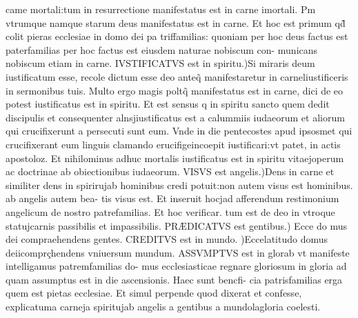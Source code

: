 \documentclass{article}
\begin{document}
\begin{pages}
came mortali:tum in resurrectione manifestatus est in carne imortali. Pm vtrumque namque starum deus manifestatus est in carne. Et hoc est primum qd̃ colit pieras ecclesiae in domo dei pa triffamilias: quoniam per hoc deus factus est paterfamilias per hoc factus est eiusdem naturae nobiscum con- municans nobiscum etiam in carne. IVSTIFICATVS est in spiritu.)Si miraris deum iustificatum esse, recole dictum esse deo anteq̃ manifestaretur in carneliustificeris in sermonibus tuis. Multo ergo magis poltq̃ manifestatus est in carne, dici de eo potest iustificatus est in spiritu. Et est sensus q in spiritu sancto quem dedit discipulis et consequenter alnsjiustificatus est a calummiis iudaeorum et aliorum qui crucifixerunt a persecuti sunt eum. Vnde in die pentecostes apud ipsosmet qui crucifixerant eum linguis clamando erucifigeincoepit iustificari:vt patet, in actis apostoloz. Et nihilominus adhuc mortalis iustificatus est in spiritu vitaejoperum ac doctrinae ab obiectionibus iudaeorum. VISVS est angelis.)Dens in carne et similiter dens in spirirujab hominibus credi potuit:non autem visus est hominibus. ab angelis autem bea- tis visus est. Et inseruit hocjad afferendum restimonium angelicum de nostro patrefamilias. Et hoc verificar. tum est de deo in vtroque statujcarnis passibilis et impassibilis. PRÆDICATVS est gentibus.) Ecce do mus dei compraehendens gentes. CREDITVS est in mundo. )Eccelatitudo domus deiicomprçhendens vniuersum mundum. ASSVMPTVS est in glorab vt manifeste intelligamus patremfamilias do- mus ecclesiasticae regnare gloriosum in gloria ad quam assumptus est in die ascensionis. Haec sunt bencfi- cia patrisfamilias erga quem est pietas ecclesiae. Et simul perpende quod dixerat et confesse, explicatuma carneja spiritujab angelis a gentibus a mundolagloria coelesti.  \pend

\end{pages}
\end{document}
